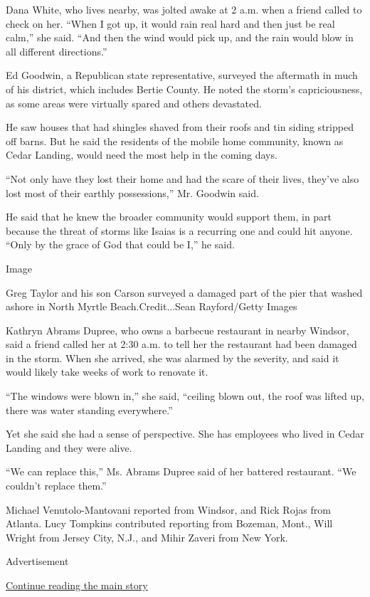 Dana White, who lives nearby, was jolted awake at 2 a.m. when a friend
called to check on her. ``When I got up, it would rain real hard and
then just be real calm,'' she said. ``And then the wind would pick up,
and the rain would blow in all different directions.''

Ed Goodwin, a Republican state representative, surveyed the aftermath in
much of his district, which includes Bertie County. He noted the storm's
capriciousness, as some areas were virtually spared and others
devastated.

He saw houses that had shingles shaved from their roofs and tin siding
stripped off barns. But he said the residents of the mobile home
community, known as Cedar Landing, would need the most help in the
coming days.

``Not only have they lost their home and had the scare of their lives,
they've also lost most of their earthly possessions,'' Mr. Goodwin said.

He said that he knew the broader community would support them, in part
because the threat of storms like Isaias is a recurring one and could
hit anyone. ``Only by the grace of God that could be I,'' he said.

Image

Greg Taylor and his son Carson surveyed a damaged part of the pier that
washed ashore in North Myrtle Beach.Credit...Sean Rayford/Getty Images

Kathryn Abrams Dupree, who owns a barbecue restaurant in nearby Windsor,
said a friend called her at 2:30 a.m. to tell her the restaurant had
been damaged in the storm. When she arrived, she was alarmed by the
severity, and said it would likely take weeks of work to renovate it.

``The windows were blown in,'' she said, ``ceiling blown out, the roof
was lifted up, there was water standing everywhere.''

Yet she said she had a sense of perspective. She has employees who lived
in Cedar Landing and they were alive.

``We can replace this,'' Ms. Abrams Dupree said of her battered
restaurant. ``We couldn't replace them.''

Michael Venutolo-Mantovani reported from Windsor, and Rick Rojas from
Atlanta. Lucy Tompkins contributed reporting from Bozeman, Mont., Will
Wright from Jersey City, N.J., and Mihir Zaveri from New York.

Advertisement

\protect\hyperlink{after-bottom}{Continue reading the main story}

